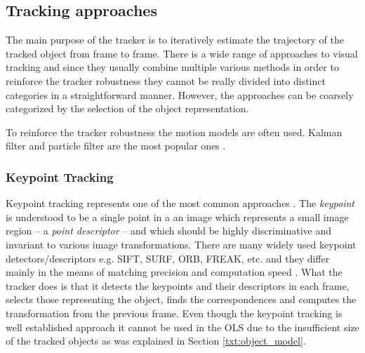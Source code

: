 \subsection{Tracking approaches}

The main purpose of the tracker is to iteratively estimate the trajectory of the tracked object from frame to frame. There is a wide range of approaches to visual tracking and since they usually combine multiple various methods in order to reinforce the tracker robustness they cannot be really divided into distinct categories in a straightforward manner. However, the approaches can be coarsely categorized by the selection of the object representation.

To reinforce the tracker robustness the motion models are often used. Kalman filter and particle filter are the most popular ones \cite{cuevas2005kalman, ObjectTrackinginMonochromaticVideo}.


\subsubsection*{Keypoint Tracking} 
Keypoint tracking represents one of the most common approaches \cite{Tomasi91detectionand,Nebehay2014WACV}. The \textit{keypoint} is understood to be a single point in a an image which represents a small image region -- a \textit{point descriptor} -- and which should be highly discriminative and invariant to various image transformations. There are many widely used keypoint detectors/descriptors e.g. SIFT, SURF, ORB, FREAK, etc. \cite{sift, Bay:2008:SRF:1370312.1370556, Rublee:2011:OEA:2355573.2356268, Ortiz:2012:FFR:2354409.2354903} and they differ mainly in the means of matching precision and computation speed \cite{Schaeffer_acomparison, conf/icpr/MiksikM12}. What the tracker does is that it detects the keypoints and their descriptors in each frame, selects those representing the object, finds the correspondences and computes the transformation from the previous frame. Even though the keypoint tracking is well established approach it cannot be used in the OLS due to the insufficient size of the tracked objects as was explained in Section \ref{txt:object_model}.

